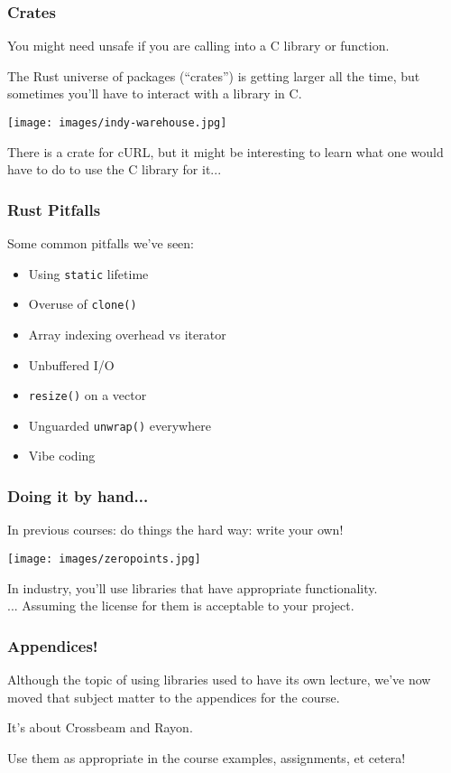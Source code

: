 \begin{frame}
\frametitle{Crates}

You might need unsafe if you are calling into a C library or function.

The Rust universe of packages (``crates'') is getting larger all the time, but sometimes you'll have to interact with a library in C.

\begin{center}
	\texttt{[image: images/indy-warehouse.jpg]}
\end{center}

There is a crate for cURL, but it might be interesting to learn what one would have to do to use the C library for it...

\end{frame}

\begin{frame}
\frametitle{Rust Pitfalls}
Some common pitfalls we've seen:

\begin{itemize}
	\item Using \texttt{static} lifetime
	\item Overuse of \texttt{clone()}
	\item Array indexing overhead vs iterator
	\item Unbuffered I/O
	\item \texttt{resize()} on a vector
	\item Unguarded \texttt{unwrap()} everywhere
	\item Vibe coding
\end{itemize}

\end{frame}


\begin{frame}
\frametitle{Doing it by hand...}

In previous courses: do things the hard way: write your own!

\begin{center}
	\texttt{[image: images/zeropoints.jpg]}
\end{center}

In industry, you'll use libraries that have appropriate functionality.\\
\quad ... Assuming the license for them is acceptable to your project.

\end{frame}

\begin{frame}
\frametitle{Appendices!}

Although the topic of using libraries used to have its own lecture, we've now moved that subject matter to the appendices for the course.

It's about Crossbeam and Rayon.

Use them as appropriate in the course examples, assignments, et cetera!

\end{frame}



